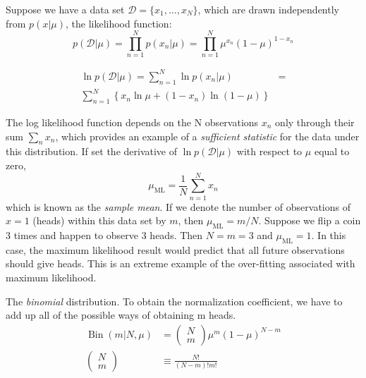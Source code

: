 \documentclass[5p,sort&compress]{elsarticle}
\begin{document}
Suppose we have a data set $\mathcal{D} = \{x_1, \ldots, x_N\}$, which are drawn independently from $p(x|\mu)$, the likelihood function:
\begin{equation}
p(\mathcal{D} | \mu)=\prod_{n=1}^{N} p\left(x_{n} | \mu\right)=\prod_{n=1}^{N} \mu^{x_{n}}(1-\mu)^{1-x_{n}}
\end{equation}

\begin{equation}
\begin{aligned}
\ln p(\mathcal{D} | \mu)=\sum_{n=1}^{N} \ln p\left(x_{n} | \mu\right) &= \\ \sum_{n=1}^{N}\left\{x_{n} \ln \mu+\left(1-x_{n}\right) \ln (1-\mu)\right\}
\end{aligned}
\end{equation}

The log likelihood function depends on the N observations $x_n$ only through their sum $\sum_n x_n$, which provides an example of a \textit{sufficient statistic} for the data under this distribution. If set the derivative of $\ln{p(\mathcal{D}|\mu)}$ with respect to $\mu$ equal to zero,
\begin{equation}
\mu_{\mathrm{ML}}=\frac{1}{N} \sum_{n=1}^{N} x_{n}
\end{equation}
which is known as the \textit{sample mean}. If we denote the number of observations of $x=1$ (heads) within this data set by $m$, then $\mu_{\mathrm{ML}}=m/N$. Suppose we flip a coin 3 times and happen to observe 3 heads. Then $N=m=3$ and $\mu_{\mathrm{ML}}=1$. In this case, the maximum likelihood result would predict that all future observations should give heads. This is an extreme example of the over-fitting associated with maximum likelihood.

The \textit{binomial} distribution. To obtain the normalization coefficient, we have to add up all of the possible ways of obtaining m heads.
\begin{equation}
\begin{aligned} \operatorname{Bin}(m | N, \mu) &=\left(\begin{array}{c}{N} \\ {m}\end{array}\right) \mu^{m}(1-\mu)^{N-m} \\\left(\begin{array}{c}{N} \\ {m}\end{array}\right) & \equiv \frac{N !}{(N-m) ! m !} \end{aligned}
\end{equation}
\end{document}

